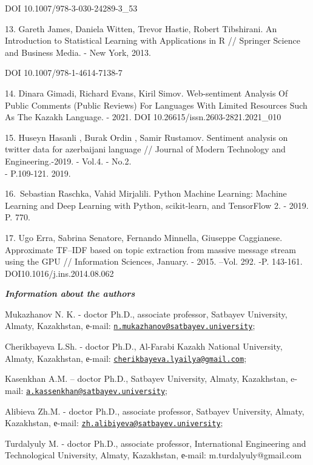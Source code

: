 DOI 10.1007/978-3-030-24289-3\_53

13. Gareth James, Daniela Witten, Trevor Hastie, Robert Tibshirani. An
Introduction to Statistical Learning with Applications in R // Springer
Science and Business Media. - New York, 2013.

DOI 10.1007/978-1-4614-7138-7

14. Dinara Gimadi, Richard Evans, Kiril Simov. Web-sentiment Analysis Of
Public Comments (Public Reviews) For Languages With Limited Resources
Such As The Kazakh Language. - 2021. DOI
10.26615/issn.2603-2821.2021\_010

15. Huseyn Hasanli , Burak Ordin , Samir Rustamov. Sentiment analysis on
twitter data for azerbaijani language // Journal of Modern Technology
and Engineering.-2019. - Vol.4. - No.2.\\
- P.109-121. 2019.

16.~Sebastian Raschka, Vahid Mirjalili. Python Machine Learning: Machine
Learning and Deep Learning with Python, scikit-learn, and TensorFlow 2.
- 2019. P. 770.

17. Ugo Erra, Sabrina Senatore, Fernando Minnella, Giuseppe Caggianese.
Approximate TF--IDF based on topic extraction from massive message
stream using the GPU // Information Sciences, January. - 2015. --Vol.
292. -P. 143-161. DOI10.1016/j.ins.2014.08.062

\emph{{\bfseries Information about the authors}}

Mukazhanov N. K. - doctor Ph.D., associate professor, Satbayev
University, Almaty, Kazakhstan, е-mail:
\href{mailto:n.mukazhanov@satbayev.university}{\nolinkurl{n.mukazhanov@satbayev.university}};

Cherikbayeva L.Sh. - doctor Ph.D., Al-Farabi Kazakh National University,
Almaty, Kazakhstan, е-mail:
\href{mailto:cherikbayeva.lyailya@gmail.com}{\nolinkurl{cherikbayeva.lyailya@gmail.com}};

Kasenkhan A.M. -- doctor Ph.D., Satbayev University, Almaty, Kazakhstan,
e-mail:
\href{mailto:a.kassenkhan@satbayev.university}{\nolinkurl{a.kassenkhan@satbayev.university}};

Alibieva Zh.M. - doctor Ph.D., associate professor, Satbayev University,
Almaty, Kazakhstan, е-mail:
\href{mailto:zh.alibiyeva@satbayev.university}{\nolinkurl{zh.alibiyeva@satbayev.university}};

Turdalyuly M. - doctor Ph.D., associate professor, International
Engineering and Technological University, Almaty, Kazakhstan, е-mail:
m.turdalyuly@gmail.com

